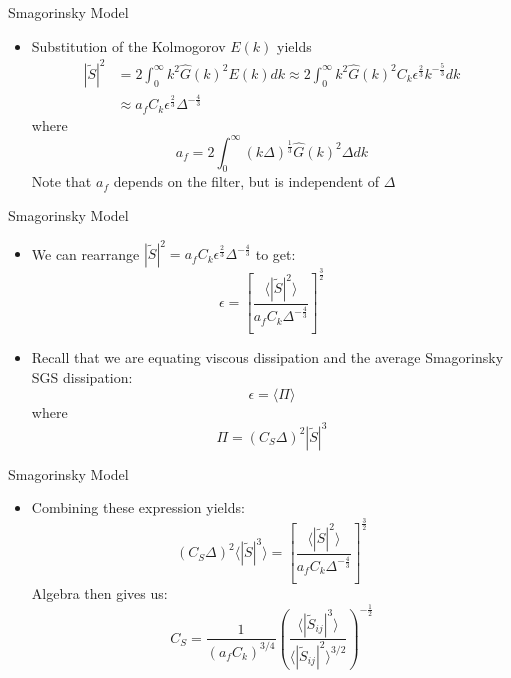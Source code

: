 \begin{frame}{Smagorinsky Model}

\begin{itemize}
	\item Substitution of the Kolmogorov $E(k)$ yields
	\begin{align*}
		|\widetilde{S}|^2 &= 2\int^{\infty}_{0} k^2 \hat G(k)^2 E(k) dk \approx 2\int^{\infty}_{0} k^2 \hat G(k)^2 C_k \epsilon^\frac{2}{3} k^{-\frac{5}{3}} dk\\ 
		&\approx a_f C_k \epsilon^\frac{2}{3} \Delta^{-\frac{4}{3}}
	\end{align*}
	where
	$$a_f = 2\int^{\infty}_{0} (k\Delta)^{\frac{1}{3}} \hat G(k)^2 \Delta dk$$ 
	Note that $a_f$ depends on the filter, but is independent of $\Delta$
\end{itemize}

\end{frame}

\begin{frame}{Smagorinsky Model}

\begin{itemize}
	\item We can rearrange $|\widetilde{S}|^2 = a_f C_k \epsilon^\frac{2}{3} \Delta^{-\frac{4}{3}}$ to get:
	$$\epsilon = \left[ \frac{\langle|\widetilde{S}|^2\rangle}{a_f C_k \Delta^{-\frac{4}{3}}}\right]^{\frac{3}{2}}$$
	\item Recall that we are equating viscous dissipation and the average Smagorinsky SGS dissipation:
	$$\epsilon = \langle \Pi \rangle$$
	where 
	$$\Pi = (C_S \Delta)^2 | \widetilde{S}|^3$$
\end{itemize}

\end{frame}

\begin{frame}{Smagorinsky Model}

\begin{itemize}
	\item Combining these expression yields:
	$$ (C_S \Delta)^2 \langle| \widetilde{S}|^3 \rangle = \left[ \frac{\langle|\widetilde{S}|^2\rangle}{a_f C_k \Delta^{-\frac{4}{3}}}\right]^{\frac{3}{2}}$$
	Algebra then gives us:
	$$C_S = \frac{1}{(a_f C_k)^{3/4}}\left(\frac{\langle |\widetilde{S}_{ij}|^3 \rangle}{\langle |\widetilde{S}_{ij}|^2\rangle^{3/2}}\right)^{-\frac{1}{2}}$$
\end{itemize}

\end{frame}


